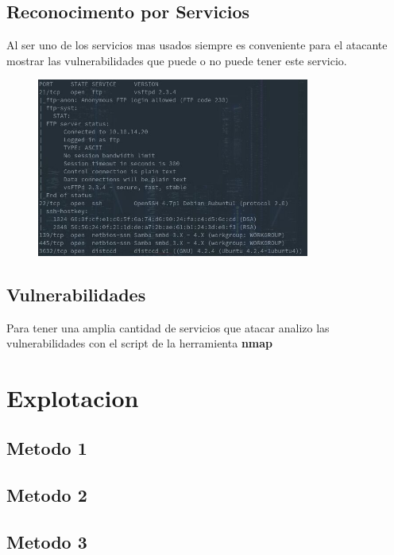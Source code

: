 \documentclass[a4paper]{article}%
\begin{document}
	\subsection{Reconocimento por Servicios}
	Al ser uno de los servicios mas usados siempre es conveniente para el atacante mostrar las vulnerabilidades que puede
	o no puede tener este servicio.
	
     \begin{figure}[h]
     \includegraphics[width=0.8\textwidth]{images/nmap_versiones.jpg}
     \end{figure}
	\newpage

	\subsection{Vulnerabilidades}
	Para tener una amplia cantidad de servicios que atacar analizo las vulnerabilidades con el script de la herramienta 
	\textbf{nmap}


	\section{Explotacion}

	\subsection{Metodo 1}

	\subsection{Metodo 2}

	\subsection{Metodo 3}
\end{document}
